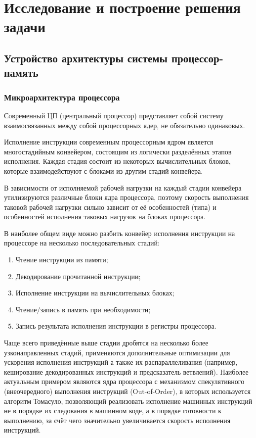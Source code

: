 \section{Исследование и построение решения задачи}
\label{sec:Section3} 

\subsection{Устройство архитектуры системы процессор-память}

\subsubsection{Микроархитектура процессора}

    Современный ЦП (центральный процессор) представляет собой
    систему взаимосвязанных между собой процессорных ядер, не обязательно одинаковых.

    Исполнение инструкции современным процессорным ядром является многостадийным конвейером,
    состоящим из логически разделённых этапов исполнения. Каждая стадия состоит из некоторых
    вычислительных блоков, которые взаимодействуют с блоками из другим стадий конвейера.

    В зависимости от исполняемой рабочей нагрузки на каждый стадии конвейера утилизируются различные
    блоки ядра процессора, поэтому скорость выполнения таковой рабочей нагрузки сильно зависит
    от её особенностей (типа) и особенностей исполнения таковых нагрузок на блоках процессора.

    В наиболее общем виде можно разбить конвейер исполнения инструкции на процессоре на несколько
    последовательных стадий:
    \begin{enumerate}
        \item Чтение инструкции из памяти;
        \item Декодирование прочитанной инструкции;
        \item Исполнение инструкции на вычислительных блоках;
        \item Чтение/запись в память при необходимости;
        \item Запись результата исполнения инструкции в регистры процессора.
    \end{enumerate}

    Чаще всего приведённые выше стадии дробятся на несколько более узконаправленных стадий, применяются
    дополнительные оптимизации для ускорения исполнения инструкций а также их распараллеливания
    (например, кеширование декодированных инструкций и предсказатель ветвлений). Наиболее
    актуальным примером являются ядра процессора с механизмом спекулятивного (внеочередного) выполнения
    инструкций (Out-of-Order), в которых используется алгоритм Томасуло, позволяющий реализовать
    исполнение машинных инструкций не в порядке их следования в машинном коде, а в порядке
    готовности к выполнению, за счёт чего значительно увеличивается скорость исполнения инструкций.

